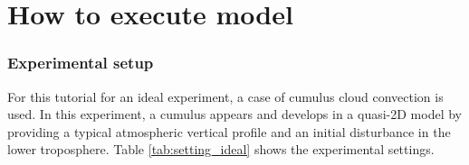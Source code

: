 \section{How to execute model} \label{sec:ideal_exp_run}


\subsubsection{Experimental setup}
For this tutorial for an ideal experiment, a case of cumulus cloud convection is used.
In this experiment, a cumulus appears and develops in a quasi-2D model
by providing a typical atmospheric vertical profile
and an initial disturbance in the lower troposphere.
Table \ref{tab:setting_ideal} shows the experimental settings.

